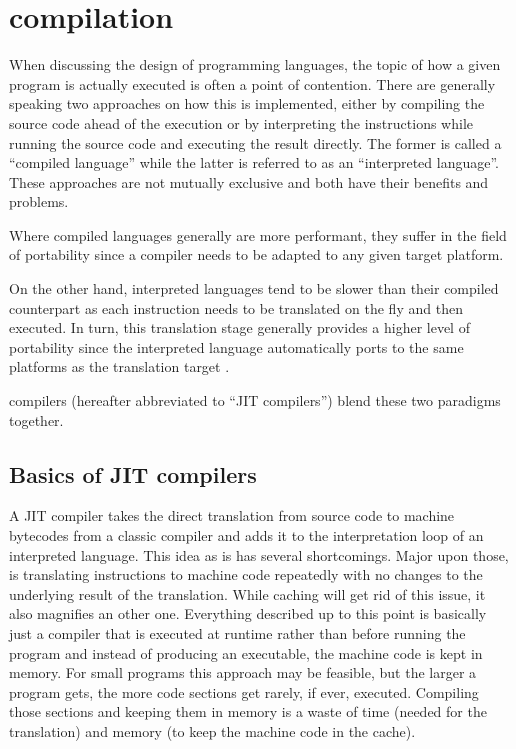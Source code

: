 \chapter{\jit{} compilation}\label{cha:jit}

When discussing the design of programming languages, the topic of how a given program is actually executed is often a point of contention. 
There are generally speaking two approaches on how this is implemented, either by compiling the source code ahead of the execution or by interpreting the instructions while running the source code and executing the result directly. 
The former is called a \enquote{compiled language} while the latter is referred to as an \enquote{interpreted language}. 
These approaches are not mutually exclusive and both have their benefits and problems. 

Where compiled languages generally are more performant, they suffer in the field of portability since a compiler needs to be adapted to any given target platform. 

On the other hand, interpreted languages tend to be slower than their compiled counterpart as each instruction needs to be translated on the fly and then executed. In turn, this translation stage generally provides a higher level of portability since the interpreted language automatically ports to the same platforms as the translation target \cite{aycock2003}.

\jit{} compilers (hereafter abbreviated to \enquote{JIT compilers}) blend these two paradigms together.

\section{Basics of JIT compilers}
A JIT compiler takes the direct translation from source code to machine bytecodes from a classic compiler and adds it to the interpretation loop of an interpreted language.
This idea as is has several shortcomings. Major upon those, is translating instructions to machine code repeatedly with no changes to the underlying result of the translation. 
While caching will get rid of this issue, it also magnifies an other one. 
Everything described up to this point is basically just a compiler that is executed at runtime rather than before running the program and instead of producing an executable, the machine code is kept in memory. 
For small programs this approach may be feasible, but the larger a program gets, the more code sections get rarely, if ever, executed. Compiling those sections and keeping them in memory is a waste of time (needed for the translation) and memory (to keep the machine code in the cache).

